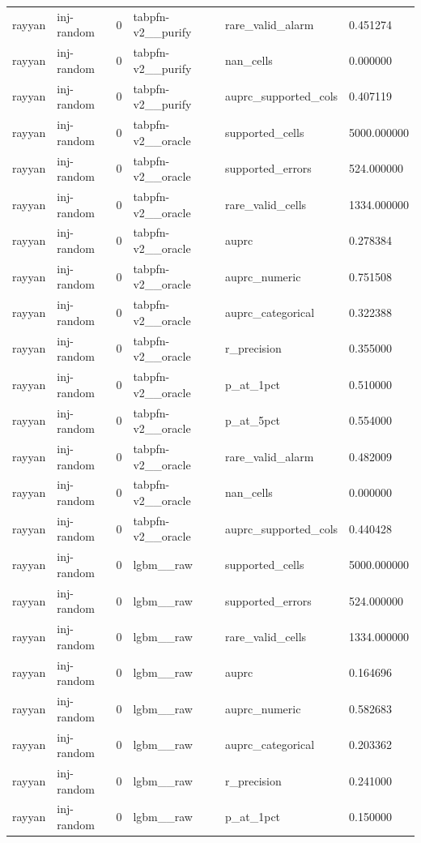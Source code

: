 \begin{tabular}{llllll}
rayyan & inj-random & 0 & tabpfn-v2\_\_purify & rare\_valid\_alarm & 0.451274 \\
rayyan & inj-random & 0 & tabpfn-v2\_\_purify & nan\_cells & 0.000000 \\
rayyan & inj-random & 0 & tabpfn-v2\_\_purify & auprc\_supported\_cols & 0.407119 \\
rayyan & inj-random & 0 & tabpfn-v2\_\_oracle & supported\_cells & 5000.000000 \\
rayyan & inj-random & 0 & tabpfn-v2\_\_oracle & supported\_errors & 524.000000 \\
rayyan & inj-random & 0 & tabpfn-v2\_\_oracle & rare\_valid\_cells & 1334.000000 \\
rayyan & inj-random & 0 & tabpfn-v2\_\_oracle & auprc & 0.278384 \\
rayyan & inj-random & 0 & tabpfn-v2\_\_oracle & auprc\_numeric & 0.751508 \\
rayyan & inj-random & 0 & tabpfn-v2\_\_oracle & auprc\_categorical & 0.322388 \\
rayyan & inj-random & 0 & tabpfn-v2\_\_oracle & r\_precision & 0.355000 \\
rayyan & inj-random & 0 & tabpfn-v2\_\_oracle & p\_at\_1pct & 0.510000 \\
rayyan & inj-random & 0 & tabpfn-v2\_\_oracle & p\_at\_5pct & 0.554000 \\
rayyan & inj-random & 0 & tabpfn-v2\_\_oracle & rare\_valid\_alarm & 0.482009 \\
rayyan & inj-random & 0 & tabpfn-v2\_\_oracle & nan\_cells & 0.000000 \\
rayyan & inj-random & 0 & tabpfn-v2\_\_oracle & auprc\_supported\_cols & 0.440428 \\
rayyan & inj-random & 0 & lgbm\_\_raw & supported\_cells & 5000.000000 \\
rayyan & inj-random & 0 & lgbm\_\_raw & supported\_errors & 524.000000 \\
rayyan & inj-random & 0 & lgbm\_\_raw & rare\_valid\_cells & 1334.000000 \\
rayyan & inj-random & 0 & lgbm\_\_raw & auprc & 0.164696 \\
rayyan & inj-random & 0 & lgbm\_\_raw & auprc\_numeric & 0.582683 \\
rayyan & inj-random & 0 & lgbm\_\_raw & auprc\_categorical & 0.203362 \\
rayyan & inj-random & 0 & lgbm\_\_raw & r\_precision & 0.241000 \\
rayyan & inj-random & 0 & lgbm\_\_raw & p\_at\_1pct & 0.150000 \\

\end{tabular}
